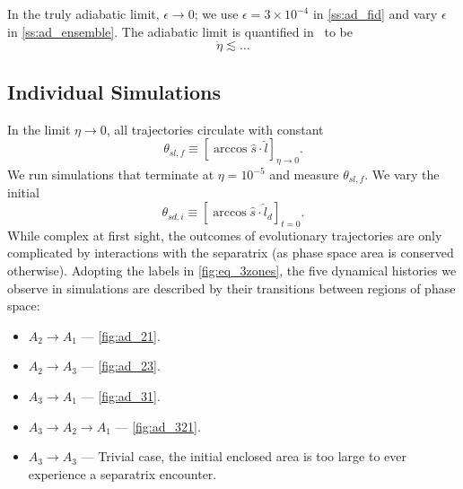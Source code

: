 \documentclass[
        fleqn,
        usenatbib,
    ]{mnras}
\newcommand*{\s}[1]{\left[#1\right]}
\begin{document}
In the truly adiabatic limit, $\epsilon \to 0$; we use $\epsilon =
3 \times 10^{-4}$ in \autoref{ss:ad_fid} and vary $\epsilon$ in
\autoref{ss:ad_ensemble}. The adiabatic limit is quantified
in~\cite{millholland_disk} to be
\begin{equation}
    \dot{\eta} \lesssim \dots \label{eq:ad_constr}
\end{equation}

\subsection{Individual Simulations}\label{ss:ad_fid}

In the limit $\eta \to 0$, all trajectories circulate with constant
\begin{equation}
    \theta_{sl,f} \equiv \s{\arccos \hat{s} \cdot \hat{l}}_{\eta \to 0}.
\end{equation}
We run simulations that terminate at $\eta = 10^{-5}$ and measure
$\theta_{sl,f}$. We vary the initial
\begin{equation}
    \theta_{sd, i} \equiv \s{\arccos \hat{s} \cdot \hat{l}_d}_{t=0}.
\end{equation}
While complex at first sight, the outcomes of evolutionary
trajectories are only complicated by interactions with the separatrix (as phase
space area is conserved otherwise). Adopting the labels in
\autoref{fig:eq_3zones}, the five dynamical histories we observe in simulations
are described by their transitions between regions of phase space:
\begin{itemize}
    \item $A_2 \to A_1$ --- \autoref{fig:ad_21}.
    \item $A_2 \to A_3$ --- \autoref{fig:ad_23}.
    \item $A_3 \to A_1$ --- \autoref{fig:ad_31}.
    \item $A_3 \to A_2 \to A_1$ --- \autoref{fig:ad_321}.
    \item $A_3 \to A_3$ --- Trivial case, the initial enclosed area is too large
        to ever experience a separatrix encounter.
\end{itemize}
\end{document}
